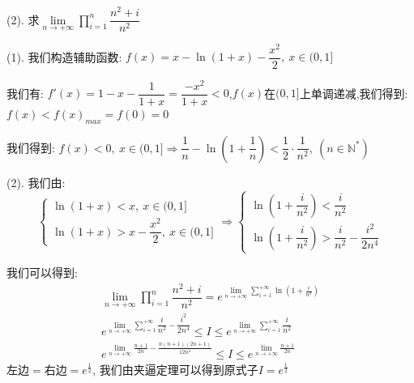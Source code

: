 (2). 求$\lim\limits_{n\rightarrow+\infty}\prod\limits_{i=1}^{n}\dfrac{n^2+i}{n^2}$
\begin{solution}

	(1). 我们构造辅助函数:  $f(x)=x-\ln(1+x)-\dfrac{x^2}{2},\ x\in(0,1]$
	
	我们有:  $f'(x)=1-x-\dfrac{1}{1+x}=\dfrac{-x^2}{1+x}<0$,$f(x)$在$(0,1]$上单调递减,我们得到:  $f(x)<f(x)_{max}=f(0)=0$
	
	我们得到:  $f(x)<0,\ x\in(0,1]\Rightarrow \dfrac{1}{n}-\ln(1+\dfrac{1}{n})<\dfrac{1}{2}\cdot\dfrac{1}{n^2},\ (n\in\mathbb{N}^{*})$
	
	(2). 我们由:  
	$$\left\lbrace
	\begin{array}{l}
		\ln(1+x)<x,\ x\in(0,1]\\
		\ln(1+x)>x-\dfrac{x^2}{2},\ x\in(0,1]
	\end{array}
	\right. \Rightarrow \left\lbrace
	\begin{array}{l}
		\ln(1+\dfrac{i}{n^2})<\dfrac{i}{n^2}\\
		\ln(1+\dfrac{i}{n^2})>\dfrac{i}{n^2}-\dfrac{i^2}{2n^4}
	\end{array}
	\right. $$
	
	我们可以得到:  
	\begin{eqnarray*}
		\lim\limits_{n\rightarrow+\infty}\prod\limits_{i=1}^{n}\dfrac{n^2+i}{n^2}=e^{\lim\limits_{n\rightarrow+\infty}\sum\limits_{i=1}^{+\infty}\ln(1+\frac{i}{n^2})}\\
		e^{\lim\limits_{n\rightarrow+\infty}\sum\limits_{i=1}^{+\infty}\dfrac{i}{n^2}-\dfrac{i^2}{2n^4}}\leq I\leq e^{\lim\limits_{n\rightarrow+\infty}\sum\limits_{i=1}^{+\infty}\dfrac{i}{n^2}}\\
		e^{\lim\limits_{n\rightarrow+\infty}\frac{n+1}{2n}-\frac{n(n+1)(2n+1)}{12n^4}}\leq I\leq e^{\lim\limits_{n\rightarrow+\infty}\frac{n+1}{2n}}
	\end{eqnarray*}
	$\text{左边}=\text{右边}=e^{\frac{1}{2}}$,
	我们由夹逼定理可以得到原式子$I=e^{\frac{1}{2}}$
\end{solution}

